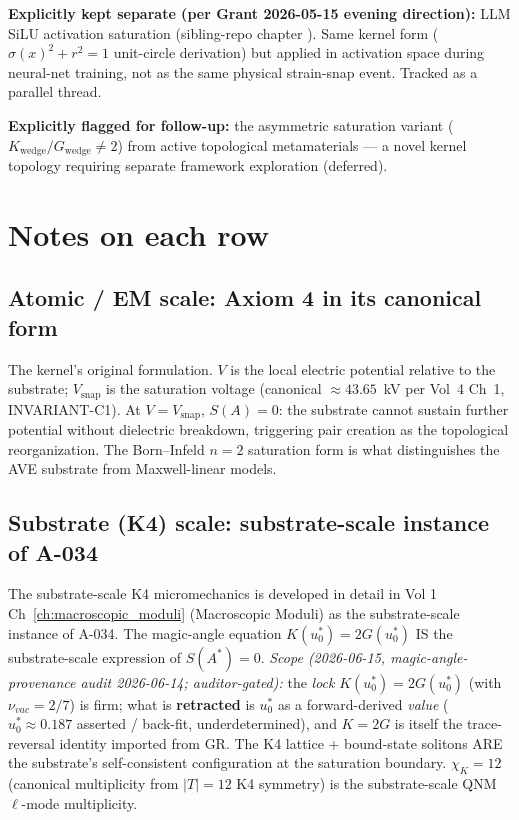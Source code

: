 \textbf{Explicitly kept separate (per Grant 2026-05-15 evening direction):}
LLM SiLU activation saturation (sibling-repo chapter
).
Same kernel form ($\sigma(x)^2 + r^2 = 1$ unit-circle derivation) but applied
in activation space during neural-net training, not as the same physical
strain-snap event. Tracked as a parallel thread.

\textbf{Explicitly flagged for follow-up:} the asymmetric saturation
variant ($K_{\text{wedge}}/G_{\text{wedge}} \neq 2$) from active topological
metamaterials --- a novel kernel topology requiring separate framework
exploration (deferred).

\section{Notes on each row}

\subsection{Atomic / EM scale: Axiom 4 in its canonical form}

The kernel's original formulation. $V$ is the local electric potential
relative to the substrate; $V_{\text{snap}}$ is the saturation voltage
(canonical $\approx 43.65$~kV per Vol~4 Ch~1, INVARIANT-C1).
At $V = V_{\text{snap}}$, $S(A) = 0$: the substrate cannot sustain
further potential without dielectric breakdown, triggering pair
creation as the topological reorganization. The Born--Infeld $n=2$
saturation form is what distinguishes the AVE substrate from
Maxwell-linear models.

\subsection{Substrate (K4) scale: substrate-scale instance of A-034}

The substrate-scale K4 micromechanics is developed in detail in
Vol 1 Ch~\ref{ch:macroscopic_moduli} (Macroscopic Moduli) as the
substrate-scale instance of A-034. The magic-angle equation
$K(u_0^*) = 2 G(u_0^*)$ IS the substrate-scale expression of
$S(A^*) = 0$. \emph{Scope (2026-06-15, magic-angle-provenance audit 2026-06-14; auditor-gated):} the \emph{lock} $K(u_0^*) = 2G(u_0^*)$ (with $\nu_{vac} = 2/7$) is firm; what is \textbf{retracted} is $u_0^*$ as a forward-derived \emph{value} ($u_0^* \approx 0.187$ asserted / back-fit, underdetermined), and $K = 2G$ is itself the trace-reversal identity imported from GR. The K4 lattice + bound-state solitons ARE the
substrate's self-consistent configuration at the saturation
boundary. $\chi_K = 12$ (canonical multiplicity from
$|T| = 12$ K4 symmetry) is the substrate-scale QNM
$\ell$-mode multiplicity.

